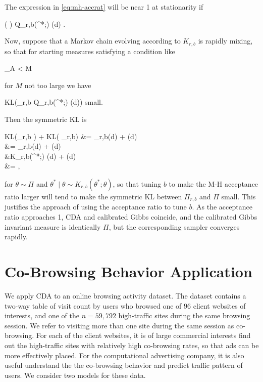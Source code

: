 \documentclass[10pt]{article}
\newcommand{\be}{\begin{equs}}
\newcommand{\ee}{\end{equs}}
\newcommand{\bb}[1]{\mathbb{#1}}
\newcommand{\KL}[2]{\textnormal{KL}\left(#1 \parallel #2\right)}
\begin{document}
The expression in \eqref{eq:mh-accrat} will be near 1 at stationarity if 
\be 
\int \log \left(  \right) Q_{r,b}(\theta^*;\theta) \Pi(d\theta) .
\ee
Now, suppose that a Markov chain evolving according to $K_{r,b}$ is rapidly mixing, so that for starting measures satisfying a condition like
\be
\sup_A  < M
\ee 
for $M$ not too large we have 
\be
\KL{\Pi_{r,b}}{\int Q_{r,b}(\theta^*;\theta) \nu(d\theta)} \quad \textnormal{small}.
\ee
Then the symmetric KL is 
\be
\KL{\Pi_{r,b}}{\Pi} + \KL{\Pi}{\Pi_{r,b}} &= \int \Pi_{r,b}(d\theta) \log {} + \int \Pi(d\theta) \log {} \\
&= \int \Pi_{r,b}(d\theta) \log {} + \int \Pi(d\theta) \log {} \\
&\approx \int K_{r,b}(\theta^*;\theta) \Pi(d\theta) \log {} + \int \Pi(d\theta) \log {} \\
&= \bb E ,
\ee
for $\theta \sim \Pi$ and $\theta^* \mid \theta \sim K_{r,b}(\theta^*;\theta)$, so that tuning $b$ to make the M-H acceptance ratio larger will tend to make the symmetric KL between $\Pi_{r,b}$ and $\Pi$ small. This justifies the approach of using the acceptance ratio to tune $b$. As the acceptance ratio approaches 1, CDA and calibrated Gibbs coincide, and the calibrated Gibbs invariant measure is identically $\Pi$, but the corresponding  sampler converges rapidly. 

\section{Co-Browsing Behavior Application}

We apply CDA to an online browsing activity dataset. The dataset contains a two-way  table of visit count by users who browsed one of $96$ client websites of interests, and one of the  $n=59,792$ high-traffic sites during the same browsing session. We refer to visiting more than one site during the same session as co-browsing. For each of the client websites, it is of large commercial interests find out the high-traffic sites with relatively high co-browsing rates, so that ads can be more effectively placed. For the computational advertising company, it is also useful understand the the co-browsing behavior and predict traffic pattern of users. We consider two models for these data.
\end{document}
